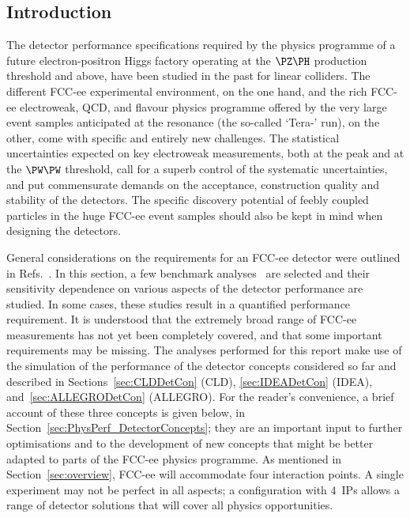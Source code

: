 \subsection{Introduction}
\label{sec:PhysPerf_Introduction}

The detector performance specifications required by the physics programme of a future electron-positron Higgs factory 
operating at the $\PZ\PH$ production threshold and above, have been studied in the past for linear colliders. 
The different FCC-ee experimental environment, on the one hand, 
and the rich FCC-ee electroweak, QCD, and flavour physics programme offered by the very large event samples anticipated at the \PZ resonance 
(the so-called `Tera-\PZ' run), on the other, come with specific and entirely new challenges. 
The statistical uncertainties expected on key electroweak measurements,
both at the \PZ peak and at the $\PW\PW$ threshold, 
call for a superb control of the systematic uncertainties, 
and put commensurate demands on the acceptance, construction quality and stability of the detectors.
The specific discovery potential of feebly coupled particles in the huge FCC-ee event samples 
should also be kept in mind when designing the detectors. 

General considerations on the requirements for an FCC-ee detector were outlined in Refs.~\cite{Azzi:2021ylt, Blondel:2021ema}. 
In this section, a few benchmark analyses~\cite{SnowmassBenchmarkProcesses} are selected and their sensitivity dependence on various aspects of the detector performance are studied. 
In some cases, these studies result in a quantified performance requirement. 
It is understood that the extremely broad range of FCC-ee measurements has not yet been completely covered, and that some important requirements may be missing. 
The analyses performed for this report make use of the simulation of the performance of the detector concepts considered so far 
and described in Sections~\ref{sec:CLDDetCon} (CLD), \ref{sec:IDEADetCon} (IDEA), and~\ref{sec:ALLEGRODetCon} (ALLEGRO). 
For the reader's convenience, a brief account of these three concepts is given below, in Section~\ref{sec:PhysPerf_DetectorConcepts}; 
they are an important input to further optimisations and to the development of new concepts 
that might be better adapted to parts of the FCC-ee physics programme. 
As mentioned in Section~\ref{sec:overview}, FCC-ee will accommodate four interaction points. 
A single experiment may not be perfect in all aspects; 
a configuration with 4~IPs allows a range of detector solutions that will cover all physics opportunities.

